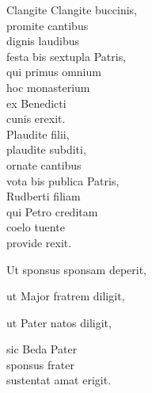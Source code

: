 \documentclass[tocstyle=ref-genre]{ees}
\begin{document}
{\begin{movement}{Clangite}
  \voice[Coro]
  Clangite buccinis,\\
  promite cantibus\\
  dignis laudibus\\
  festa bis sextupla Patris,\\
  qui primus omnium\\
  hoc monasterium\\
  ex Benedicti\\
  cunis erexit.\\
  Plaudite filii,\\
  plaudite subditi,\\
  ornate cantibus\\
  vota bis publica Patris,\\
  Rudberti filiam\\
  qui Petro creditam\\
  coelo tuente\\
  provide rexit.

  Ut sponsus sponsam deperit,

  ut Major fratrem diligit,

  ut Pater natos diligit,

  \voice[Soli]
  sic Beda Pater\\
  sponsus frater\\
  sustentat amat erigit.
\end{movement}
}

\eesScore
\end{document}
